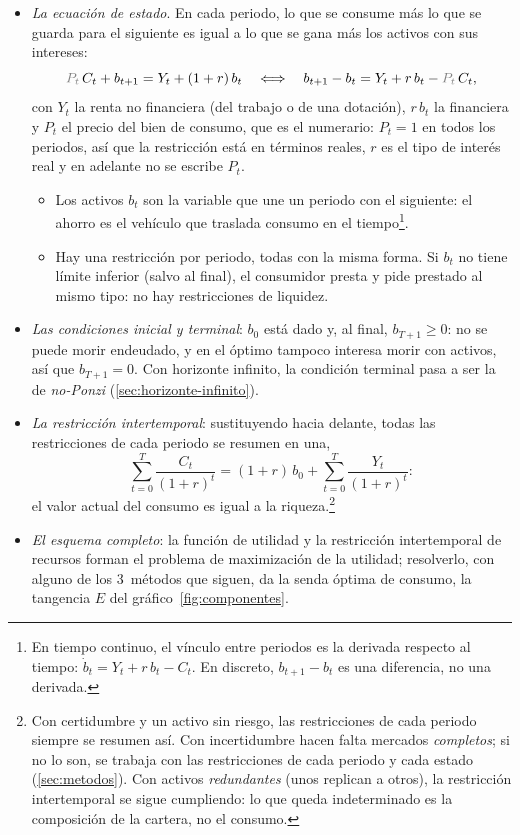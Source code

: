 \documentclass[11pt]{article}
\begin{document}
\begin{itemize}
\item \emph{La ecuación de estado}. En cada periodo, lo que se consume más lo que se guarda para el siguiente es igual a lo que se gana más los activos con sus intereses:
  \begin{equation}
  {\color{gray}P_t}\,C_t+b_{t+1}=Y_t+(1+r)\,b_t\quad\Longleftrightarrow\quad b_{t+1}-b_t=Y_t+r\,b_t-{\color{gray}P_t}\,C_t,\label{eq:restriccion-periodo}
  \end{equation}
  con $Y_t$ la renta no financiera (del trabajo o de una dotación), $r\,b_t$ la financiera y $P_t$ el precio del bien de consumo, que es el numerario: $P_t=1$ en todos los periodos, así que la restricción está en términos reales, $r$ es el tipo de interés real y en adelante no se escribe $P_t$.
  \begin{itemize}
  \item Los activos $b_t$ son la variable que une un periodo con el siguiente: el ahorro es el vehículo que traslada consumo en el tiempo\footnote{En tiempo continuo, el vínculo entre periodos es la derivada respecto al tiempo: $\dot b_t=Y_t+r\,b_t-C_t$. En discreto, $b_{t+1}-b_t$ es una diferencia, no una derivada.}.
  \item Hay una restricción por periodo, todas con la misma forma. Si $b_t$ no tiene límite inferior (salvo al final), el consumidor presta y pide prestado al mismo tipo: no hay restricciones de liquidez.
  \end{itemize}
\item \emph{Las condiciones inicial y terminal}: $b_0$ está dado y, al final, $b_{T+1}\geq0$: no se puede morir endeudado, y en el óptimo tampoco interesa morir con activos, así que $b_{T+1}=0$. Con horizonte infinito, la condición terminal pasa a ser la de \emph{no-Ponzi} (\ref{sec:horizonte-infinito}).
\item \emph{La restricción intertemporal}: sustituyendo hacia delante, todas las restricciones de cada periodo se resumen en una,
  \begin{equation*}
  \sum_{t=0}^{T}\frac{C_t}{(1+r)^t}=(1+r)\,b_0+\sum_{t=0}^{T}\frac{Y_t}{(1+r)^t}:
  \end{equation*}
  el valor actual del consumo es igual a la riqueza.\footnote{Con certidumbre y un activo sin riesgo, las restricciones de cada periodo siempre se resumen así. Con incertidumbre hacen falta mercados \emph{completos}; si no lo son, se trabaja con las restricciones de cada periodo y cada estado (\ref{sec:metodos}). Con activos \emph{redundantes} (unos replican a otros), la restricción intertemporal se sigue cumpliendo: lo que queda indeterminado es la composición de la cartera, no el consumo.}
\item \emph{El esquema completo}: la función de utilidad y la restricción intertemporal de recursos forman el problema de maximización de la utilidad; resolverlo, con alguno de los 3~métodos que siguen, da la senda óptima de consumo, la tangencia $E$ del gráfico~\ref{fig:componentes}.
\end{itemize}
\end{document}
